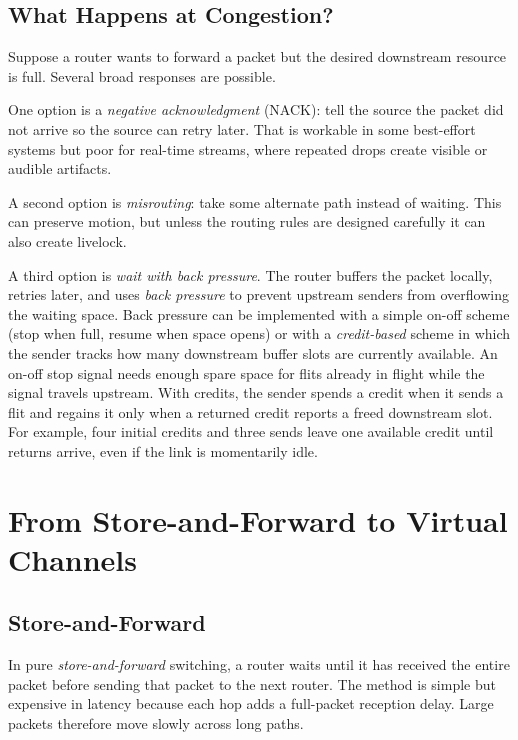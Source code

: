 \subsection{What Happens at Congestion?}\label{subsec:pin-congestion-options}
Suppose a router wants to forward a packet but the desired downstream resource is full.
Several broad responses are possible.

One option is a \textit{negative acknowledgment} (NACK): tell the source the packet did not arrive so the source can retry later.
That is workable in some best-effort systems but poor for real-time streams, where repeated drops create visible or audible artifacts.

A second option is \textit{misrouting}: take some alternate path instead of waiting.
This can preserve motion, but unless the routing rules are designed carefully it can also create livelock.

A third option is \textit{wait with back pressure}.
The router buffers the packet locally, retries later, and uses \textit{back pressure} to prevent upstream senders from overflowing the waiting space.
Back pressure can be implemented with a simple on-off scheme (stop when full, resume when space opens) or with a \textit{credit-based} scheme in which the sender tracks how many downstream buffer slots are currently available.
An on-off stop signal needs enough spare space for flits already in flight while the signal travels upstream.
With credits, the sender spends a credit when it sends a flit and regains it only when a returned credit reports a freed downstream slot.
For example, four initial credits and three sends leave one available credit until returns arrive, even if the link is momentarily idle.

\section{From Store-and-Forward to Virtual Channels}\label{sec:pin-vc-evolution}

\subsection{Store-and-Forward}\label{subsec:pin-store-forward}
In pure \textit{store-and-forward} switching, a router waits until it has received the entire packet before sending that packet to the next router.
The method is simple but expensive in latency because each hop adds a full-packet reception delay.
Large packets therefore move slowly across long paths.


